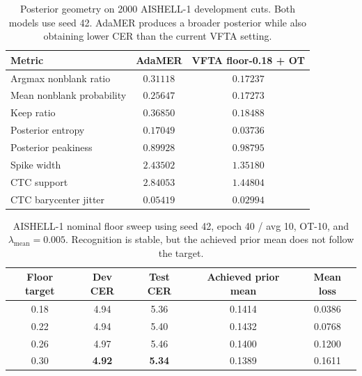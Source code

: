 \begin{table}[t]
  \centering
  \small
  \caption{Posterior geometry on 2000 AISHELL-1 development cuts.
  Both models use seed 42. AdaMER produces a broader posterior while
  also obtaining lower CER than the current VFTA setting.}
  \label{tab:aishell_adamer_vfta_geometry}
  \begin{tabular}{lcc}
    \toprule
    Metric & AdaMER & VFTA floor-0.18 + OT \\
    \midrule
    Argmax nonblank ratio
      & $\mathbf{0.31118}$ & $0.17237$ \\
    Mean nonblank probability
      & $\mathbf{0.25647}$ & $0.17273$ \\
    Keep ratio
      & $\mathbf{0.36850}$ & $0.18488$ \\
    Posterior entropy
      & $\mathbf{0.17049}$ & $0.03736$ \\
    Posterior peakiness
      & $0.89928$ & $\mathbf{0.98795}$ \\
    Spike width
      & $\mathbf{2.43502}$ & $1.35180$ \\
    CTC support
      & $\mathbf{2.84053}$ & $1.44804$ \\
    CTC barycenter jitter
      & $0.05419$ & $\mathbf{0.02994}$ \\
    \bottomrule
  \end{tabular}
\end{table}

\begin{table}[t]
  \centering
  \small
  \caption{AISHELL-1 nominal floor sweep using seed 42, epoch 40 /
  avg 10, OT-10, and $\lambda_{\mathrm{mean}}=0.005$. Recognition is
  stable, but the achieved prior mean does not follow the target.}
  \label{tab:aishell_floor_diagnostic}
  \begin{tabular}{ccccc}
    \toprule
    Floor target & Dev CER & Test CER & Achieved prior mean & Mean loss \\
    \midrule
    0.18 & 4.94 & 5.36 & 0.1414 & 0.0386 \\
    0.22 & 4.94 & 5.40 & 0.1432 & 0.0768 \\
    0.26 & 4.97 & 5.46 & 0.1400 & 0.1200 \\
    0.30 & \textbf{4.92} & \textbf{5.34} & 0.1389 & 0.1611 \\
    \bottomrule
  \end{tabular}
\end{table}

